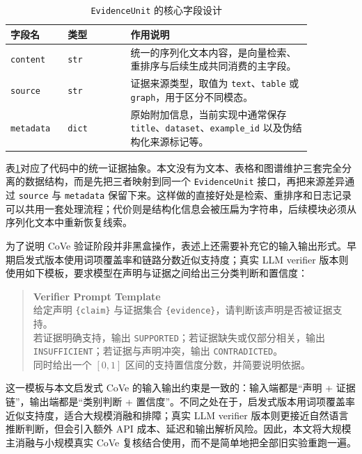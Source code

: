 \begin{table}[!htbp]
\centering
\caption{\texttt{EvidenceUnit} 的核心字段设计}
\label{tab:evidence_unit_schema}
\small
\begin{tabular}{|p{0.16\linewidth}|p{0.18\linewidth}|p{0.52\linewidth}|}
\hline
\textbf{字段名} & \textbf{类型} & \textbf{作用说明} \\
\hline
\texttt{content} & \texttt{str} & 统一的序列化文本内容，是向量检索、重排序与后续生成共同消费的主字段。 \\
\hline
\texttt{source} & \texttt{str} & 证据来源类型，取值为 \texttt{text}、\texttt{table} 或 \texttt{graph}，用于区分不同模态。 \\
\hline
\texttt{metadata} & \texttt{dict} & 原始附加信息，当前实现中通常保存 \texttt{title}、\texttt{dataset}、\texttt{example\_id} 以及伪结构化来源标记等。 \\
\hline
\end{tabular}
\end{table}

表\ref{tab:evidence_unit_schema}对应了代码中的统一证据抽象。本文没有为文本、表格和图谱维护三套完全分离的数据结构，而是先把三者映射到同一个 \texttt{EvidenceUnit} 接口，再把来源差异通过 \texttt{source} 与 \texttt{metadata} 保留下来。这样做的直接好处是检索、重排序和日志记录可以共用一套处理流程；代价则是结构化信息会被压扁为字符串，后续模块必须从序列化文本中重新恢复线索。

为了说明 CoVe 验证阶段并非黑盒操作，表述上还需要补充它的输入输出形式。早期启发式版本使用词项覆盖率和链路分数近似支持度；真实 LLM verifier 版本则使用如下模板，要求模型在声明与证据之间给出三分类判断和置信度：

\begin{quote}
\small
\textbf{Verifier Prompt Template}\\
给定声明 \texttt{\{claim\}} 与证据集合 \texttt{\{evidence\}}，请判断该声明是否被证据支持。\\
若证据明确支持，输出 \texttt{SUPPORTED}；若证据缺失或仅部分相关，输出 \texttt{INSUFFICIENT}；若证据与声明冲突，输出 \texttt{CONTRADICTED}。\\
同时给出一个 $[0,1]$ 区间的支持置信度分数，并简要说明依据。
\end{quote}

这一模板与本文启发式 CoVe 的输入输出约束是一致的：输入端都是“声明 + 证据链”，输出端都是“类别判断 + 置信度”。不同之处在于，启发式版本用词项覆盖率近似支持度，适合大规模消融和排障；真实 LLM verifier 版本则更接近自然语言推断判断，但会引入额外 API 成本、延迟和输出解析风险。因此，本文将大规模主消融与小规模真实 CoVe 复核结合使用，而不是简单地把全部旧实验重跑一遍。

